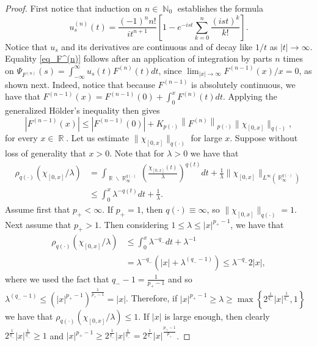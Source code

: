 \documentclass[11pt,reqno]{amsart}
\theoremstyle{definition}
\theoremstyle{definition}
\theoremstyle{definition}
\DeclareMathOperator{\R}{\mathbb{R}}
\DeclareMathOperator{\N}{\mathbb{N}}
\newcommand{\p}{p(\cdot)}
\newcommand{\q}{q(\cdot)}
\begin{document}
\begin{proof}
      First notice that induction on $n\in\N_0$ establishes the formula
    $$
    u_s^{(n)}(t)=\frac{(-1)^n n!}{{i} t^{n+1}}\left[1-{e}^{-{i} s t} \sum_{k=0}^n \frac{({i} s t)^k}{k!}\right].
    $$
    Notice that $u_s$ and its derivatives are continuous and of decay like $1 / t$ as $|t| \rightarrow \infty$. Equality \eqref{eq_F^(n)} follows after an application of integration by parts $n$ times on $\Psi_{F^{(n)}}(s)=\int_{-\infty}^{\infty} u_s(t) F^{(n)}(t) {d} t$,  since $\lim_{|x|\to\infty}F^{(n-1)}(x)/x=0$, as shown next. Indeed, notice that because $F^{(n-1)}$ is absolutely continuous, we have that $F^{(n-1)}(x)=F^{(n-1)}(0)+\int_0^x F^{(n)}(t) {d} t$. Applying the generalized Hölder's inequality then gives 
    \begin{equation*}
        \left|F^{(n-1)}(x)\right| \leq\left|F^{(n-1)}(0)\right|+K_{\p}\left\|F^{(n)}\right\|_{\p}\|\chi_{[0,x]}\|_{q(\cdot)},
    \end{equation*}
    for every $x\in\R$. Let us estimate $\|\chi_{[0,x]}\|_{q(\cdot)}$ for large $x$. Suppose without loss of generality that $x> 0$. Note that for $\lambda>0$ we have that
    \begin{align*}
\rho_{\q}\left(\chi_{[0,x]}/\lambda\right)&=\int_{\R\backslash \R^{\q}_{\infty}}\left(\frac{\chi_{[0,x]}(t)}{\lambda}\right)^{q(t)}dt+\frac{1}{\lambda}\|\chi_{[0,x]}\|_{L^\infty(\R^{\q}_\infty)}\\
&\leq \int_0^x\lambda^{-q(t)}dt+\frac{1}{\lambda}.
    \end{align*}
    Assume first that $p_{+}<\infty$. If $p_{+}=1$, then $\q\equiv \infty$, so $\|\chi_{[0,x]}\|_{q(\cdot)}=1$. Next assume that $p_{+}>1$. Then considering $1\leq \lambda\leq |x|^{p_{+}-1}$, we have that 
    \begin{align*}
        \rho_{\q}\left(\chi_{[0,x]}/\lambda\right)&\leq \int_0^x\lambda^{-q_{-}}dt+\lambda^{-1}\\
        &=\lambda^{-q_{-}}\left(|x|+\lambda^{(q_{-}-1)}\right)\leq \lambda^{-q_{-}}2|x|,
    \end{align*}
    where we used the fact that  $q_{-}-1=\frac{1}{p_{+}-1}$ and so $\lambda^{(q_{-}-1)}\leq \left(|x|^{p_{+}-1}\right)^{\frac{1}{p_{+}-1}}=|x|$.
    Therefore, if $|x|^{p_{+}-1}\geq \lambda\geq \max\left\{2^{\frac{1}{q_{-}}}|x|^{\frac{1}{q_{-}}},1\right\}$ we have that $\rho_{\q}(\chi_{[0,x]}/\lambda)\leq 1$. 
    If $|x|$ is large enough, then clearly $2^{\frac{1}{q_{-}}}|x|^{\frac{1}{q_{-}}}\geq 1$ and $|x|^{p_{+}-1}\geq 2^{\frac{1}{q_{-}}}|x|^{\frac{1}{q_{-}}}=2^{\frac{1}{q_{-}}}|x|^{\frac{p_{+}-1}{p_{+}}}$.

\end{proof}
\end{document}
